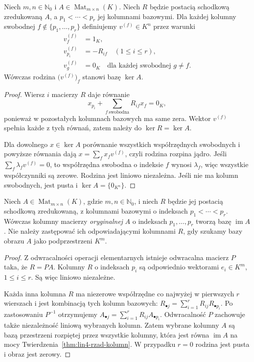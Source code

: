 \begin{twierdzenie}
\label{thm:lin5-baza-jadra}
Niech \(m,n\in\mathbb N_0\) i
\(A\in\operatorname{Mat}_{m\times n}(K)\).
Niech \(R\) będzie postacią schodkową
zredukowaną \(A\), a
\(p_1<\cdots<p_r\) jej kolumnami bazowymi.
Dla każdej kolumny swobodnej
\(f\notin\{p_1,\ldots,p_r\}\)
definiujemy \(v^{(f)}\in K^n\) przez warunki
\[
\begin{aligned}
 v^{(f)}_f&=1_K,\\
 v^{(f)}_{p_i}&=-R_{if}\quad(1\leq i\leq r),\\
 v^{(f)}_g&=0_K
 \quad\text{dla każdej swobodnej }g\ne f.
\end{aligned}
\]
Wówczas rodzina \(\bigl(v^{(f)}\bigr)_f\)
stanowi bazę \(\ker A\).
\end{twierdzenie}
\begin{proof}
Wiersz \(i\) macierzy \(R\) daje równanie
\[
 x_{p_i}+
 \sum_{f\ \text{swobodna}}R_{if}x_f=0_K,
\]
ponieważ w pozostałych kolumnach bazowych
ma same zera. Wektor \(v^{(f)}\)
spełnia każde z tych równań,
zatem należy do \(\ker R=\ker A\).

Dla dowolnego \(x\in\ker A\)
porównanie wszystkich współrzędnych
swobodnych i powyższe równania dają
\(x=\sum_f x_fv^{(f)}\),
czyli rodzina rozpina jądro.
Jeśli \(\sum_f\lambda_fv^{(f)}=0\),
to współrzędna swobodna o indeksie \(f\)
wynosi \(\lambda_f\), więc wszystkie
współczynniki są zerowe. Rodzina jest
liniowo niezależna. Jeśli nie ma
kolumn swobodnych, jest pusta i
\(\ker A=\{0_{K^n}\}\).
\end{proof}

\begin{twierdzenie}
\label{thm:lin5-baza-obrazu}
Niech \(A\in\operatorname{Mat}_{m\times n}(K)\),
gdzie \(m,n\in\mathbb N_0\), i niech
\(R\) będzie jej postacią schodkową
zredukowaną, z kolumnami bazowymi
o indeksach \(p_1<\cdots<p_r\).
Wówczas kolumny macierzy \emph{oryginalnej}
\(A\) o indeksach \(p_1,\ldots,p_r\)
tworzą bazę \(\operatorname{im}A\).
Nie należy zastępować ich odpowiadającymi
kolumnami \(R\), gdy szukamy bazy
obrazu \(A\) jako podprzestrzeni \(K^m\).
\end{twierdzenie}
\begin{proof}
Z odwracalności operacji elementarnych
istnieje odwracalna macierz \(P\)
taka, że \(R=PA\).
Kolumny \(R\) o indeksach \(p_i\)
są odpowiednio wektorami
\(e_i\in K^m\), \(1\leq i\leq r\).
Są więc liniowo niezależne.

Każda inna kolumna \(R\) ma niezerowe
współrzędne co najwyżej w pierwszych
\(r\) wierszach i jest kombinacją
tych kolumn bazowych:
\(R_{\bullet j}=\sum_{i=1}^r R_{ij}R_{\bullet p_i}\).
Po zastosowaniu \(P^{-1}\) otrzymujemy
\(A_{\bullet j}=\sum_{i=1}^r R_{ij}A_{\bullet p_i}\).
Odwracalność \(P\) zachowuje także
niezależność liniową wybranych kolumn.
Zatem wybrane kolumny \(A\) są bazą
przestrzeni rozpiętej przez wszystkie
kolumny, która jest równa
\(\operatorname{im}A\) na mocy
Twierdzenia~\ref{thm:lin4-rzad-kolumn}.
W przypadku \(r=0\) rodzina jest pusta
i obraz jest zerowy.
\end{proof}

